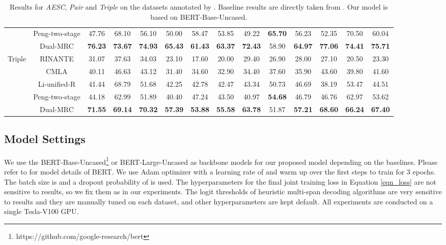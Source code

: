\documentclass[letterpaper]{article} \usepackage{aaai21}  \usepackage{times}  \usepackage{helvet} \usepackage{courier}  \usepackage[hyphens]{url}  \usepackage{graphicx} \urlstyle{rm} \def\UrlFont{\rm}  \usepackage{natbib}  \usepackage{caption}
\begin{document}
\begin{table*}
\begin{tabular}{cc|ccc|ccc|ccc|ccc}
    \multicolumn{1}{c|}{}                        & Peng-two-stage & 47.76 & 68.10 & 56.10          & 50.00 & 58.47 & 53.85          & 49.22 & \textbf{65.70} & 56.23          & 52.35 & 70.50 & 60.04          \\ \cline{2-14}
    \multicolumn{1}{c|}{}                        & Dual-MRC       & \textbf{76.23} & \textbf{73.67} & \textbf{74.93} & \textbf{65.43} & \textbf{61.43} & \textbf{63.37} & \textbf{72.43} & 58.90 & \textbf{64.97} & \textbf{77.06} & \textbf{74.41} & \textbf{75.71} \\ \hline
    \multicolumn{1}{c|}{\multirow{5}{*}{Triple}} & RINANTE        & 31.07 & 37.63 & 34.03          & 23.10 & 17.60 & 20.00          & 29.40 & 26.90 & 28.00          & 27.10 & 20.50 & 23.30          \\
    \multicolumn{1}{c|}{}                        & CMLA           & 40.11 & 46.63 & 43.12          & 31.40 & 34.60 & 32.90          & 34.40 & 37.60 & 35.90          & 43.60 & 39.80 & 41.60          \\
    \multicolumn{1}{c|}{}                        & Li-unified-R   & 41.44 & 68.79 & 51.68          & 42.25 & 42.78 & 42.47          & 43.34 & 50.73 & 46.69          & 38.19 & 53.47 & 44.51          \\
    \multicolumn{1}{c|}{}                        & Peng-two-stage & 44.18 & 62.99 & 51.89          & 40.40 & 47.24 & 43.50          & 40.97 & \textbf{54.68} & 46.79          & 46.76 & 62.97 & 53.62          \\ \cline{2-14}
    \multicolumn{1}{c|}{}                        & Dual-MRC       & \textbf{71.55} & \textbf{69.14} &\textbf{70.32}  & \textbf{57.39} & \textbf{53.88} & \textbf{55.58} & \textbf{63.78} & 51.87 & \textbf{57.21} & \textbf{68.60} & \textbf{66.24} & \textbf{67.40} \\ \hline
    \end{tabular} 
    \caption{Results for \emph{AESC}, \emph{Pair} and \emph{Triple} on the datasets annotated by \cite{peng2020knowing}. 
    Baseline results are directly taken from \cite{peng2020knowing}. Our model is based on BERT-Base-Uncased.}
    \label{exp_3}
    \end{table*}

\subsection{Model Settings}
We use the BERT-Base-Uncased\footnote{https://github.com/google-research/bert} or BERT-Large-Uncased
as backbone models for our proposed model depending on the baselines. 
Please refer to \cite{devlin2019bert} for model details of BERT.
We use Adam optimizer with a learning rate of  and warm up over the first  steps to train for 3 epochs. 
The batch size is  and a dropout probability of  is used. 
The hyperparameters  for the final joint training loss in Equation \ref{eqn_loss} are not sensitive to results, so we fix them as  in our experiments.
The logit thresholds of heuristic multi-span decoding algorithms \cite{hu-etal-2019-open} are very sensitive to results and they are manually tuned on each dataset, and other hyperparameters are kept default. All experiments are conducted on a single Tesla-V100 GPU.
\end{document}
